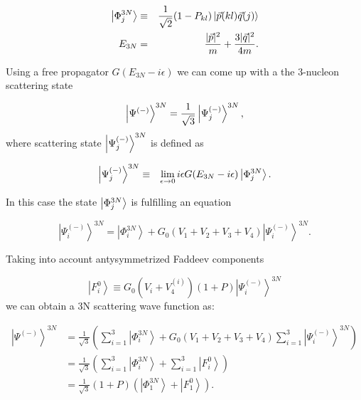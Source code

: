     \begin{eqnarray}
        \ket{\Phi^{3N}_j} &\equiv& \frac{1}{\sqrt{2}}(1 - P_{kl})
        \ket{\vec{p}(kl)\vec{q}(j)}\\
        E_{3N} &=& \frac{|\vec{p}|^2}{m} + \frac{3 |\vec{q}|^2}{4m}.
    \end{eqnarray}
    
    Using a free propagator $G(E_{3N} - i\epsilon)$ we can come up with
    a the 3-nucleon scattering state

    \begin{equation}
        \ket{\Psi^{(-)}}^{3N} = \frac{1}{\sqrt{3}}\ket{\Psi^{(-)}_j}^{3N},  
    \end{equation}
    where scattering state $\ket{\Psi^{(-)}_j}^{3N}$ is defined as 

    \begin{eqnarray}
        \ket{\Psi^{(-)}_j}^{3N}  &\equiv& \lim_{\epsilon \rightarrow 0}
        i \epsilon G(E_{3N} - i\epsilon)\ket{\Phi^{3N}_j}.
    \end{eqnarray}

    In this case the state $\ket{\Phi^{3N}_j}$ is fulfilling an equation \cite{Glockle1983}

    \begin{equation}
        \left|\Psi_i^{(-)}\right\rangle^{3 N}=\left|\Phi_i^{3 N}\right\rangle+
        G_0\left(V_1+V_2+V_3+V_4\right)\left|\Psi_i^{(-)}\right\rangle^{3 N}.
    \end{equation}

    Taking into account antysymmetrized Faddeev components

    \begin{equation}
        \left|F_i^0\right\rangle \equiv G_0\left(V_i+V_4^{(i)}\right)(1+P)\left|\Psi_i^{(-)}\right\rangle^{3 N}
        \label{faddeev_3n}
    \end{equation}
    we can obtain a 3N scattering wave function as:

    \begin{equation}
        \begin{aligned}
            \left|\Psi^{(-)}\right\rangle^{3 N} & =\frac{1}{\sqrt{3}}\left(\sum_{i=1}^3\left|\Phi_i^{3 N}\right\rangle+G_0\left(V_1+V_2+V_3+V_4\right) \sum_{i=1}^3\left|\Psi_i^{(-)}\right\rangle^{3 N}\right) \\
            & =\frac{1}{\sqrt{3}}\left(\sum_{i=1}^3\left|\Phi_i^{3 N}\right\rangle+\sum_{i=1}^3\left|F_i^0\right\rangle\right) \\
            & =\frac{1}{\sqrt{3}}(1+P)\left(\left|\Phi_1^{3 N}\right\rangle+\left|F_1^0\right\rangle\right) .
        \end{aligned}
        \label{3n_scat_psi}
    \end{equation}

